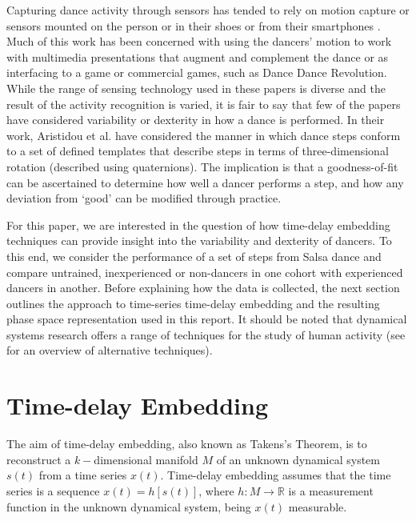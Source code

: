 \documentclass[10pt,journal,compsoc]{IEEEtran}
\begin{document}
Capturing dance activity through sensors has tended to rely on motion capture 
\cite{Alexiadis2014} or sensors mounted on the person \cite{Lynch2005} 
or in their shoes \cite{Paradiso1997} or from their smartphones  \cite{Wei2014}.
Much of this work has been concerned with using the dancers’ motion to work with 
multimedia presentations that augment and complement the dance \cite{Griffith1998, Park2006}
or as interfacing to a game \cite{Chu2012} or commercial games, such as Dance Dance Revolution.  
While the range of sensing technology used in these papers is diverse and the result of the activity 
recognition is varied, it is fair to say that few of the papers have considered 
variability or dexterity in how a dance is performed. 
In their work, Aristidou et al. \cite{Aristidou2014}
have considered the manner in which dance steps conform to a set of defined 
templates that describe steps in terms of three-dimensional rotation (described using quaternions).  
The implication is that a goodness-of-fit can be ascertained to determine how well a dancer 
performs a step, and how any deviation from ‘good’ can be modified through practice. 

For this paper, we are interested in the question of how time-delay embedding techniques 
can provide insight into the variability and dexterity of dancers. 
To this end, we consider the performance of a set of steps from Salsa dance and 
compare untrained, inexperienced or non-dancers in one cohort with experienced dancers in another. 
Before explaining how the data is collected, the next section outlines the approach to time-series 
time-delay embedding and the resulting phase space representation used in this report. 
It should be noted that dynamical systems research offers a range of techniques for the study of 
human activity (see \cite{Guastello2011} for an overview of alternative techniques). 



\section{Time-delay Embedding}
The aim of time-delay embedding, also known as Takens's Theorem, is to reconstruct 
a $k-$dimensional manifold $M$ of an unknown dynamical system $s(t)$ 
from a time series $x(t)$. Time-delay embedding assumes that the time series 
is a sequence $x(t)=h[s(t)]$,  where  $h: M \rightarrow \mathbb{R}$ 
is a measurement function in the unknown dynamical system, being $x(t)$ measurable.
\end{document}
